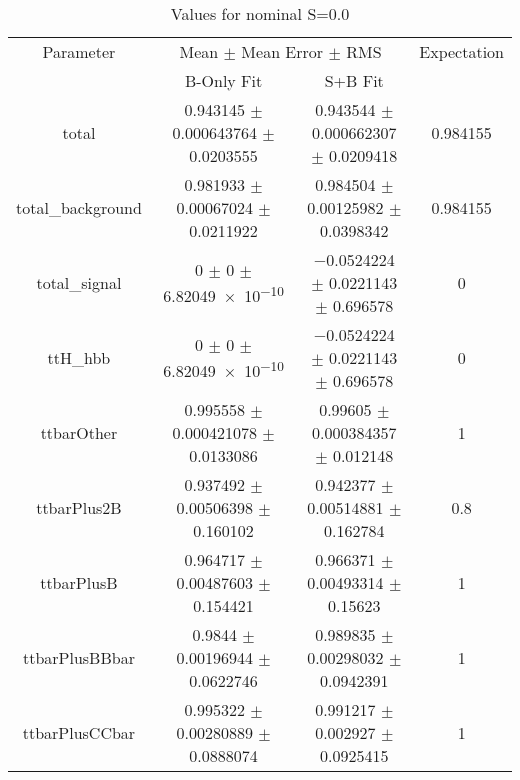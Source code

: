 \begin{table}
\centering
\caption{Values for nominal S=0.0}
\begin{tabular}{cccc}
\toprule
Parameter & \multicolumn{2}{c}{Mean $\pm$ Mean Error $\pm$ RMS} & Expectation\\
 & B-Only Fit & S+B Fit & \\
\midrule
total & \num{0.943145} $\pm$ \num{0.000643764} $\pm$ \num{0.0203555} & \num{0.943544} $\pm$ \num{0.000662307} $\pm$ \num{0.0209418} & \num{0.984155}\\
total\_background & \num{0.981933} $\pm$ \num{0.00067024} $\pm$ \num{0.0211922} & \num{0.984504} $\pm$ \num{0.00125982} $\pm$ \num{0.0398342} & \num{0.984155}\\
total\_signal & \num{0} $\pm$ \num{0} $\pm$ \num{6.82049e-10} & \num{-0.0524224} $\pm$ \num{0.0221143} $\pm$ \num{0.696578} & \num{0}\\
ttH\_hbb & \num{0} $\pm$ \num{0} $\pm$ \num{6.82049e-10} & \num{-0.0524224} $\pm$ \num{0.0221143} $\pm$ \num{0.696578} & \num{0}\\
ttbarOther & \num{0.995558} $\pm$ \num{0.000421078} $\pm$ \num{0.0133086} & \num{0.99605} $\pm$ \num{0.000384357} $\pm$ \num{0.012148} & \num{1}\\
ttbarPlus2B & \num{0.937492} $\pm$ \num{0.00506398} $\pm$ \num{0.160102} & \num{0.942377} $\pm$ \num{0.00514881} $\pm$ \num{0.162784} & \num{0.8}\\
ttbarPlusB & \num{0.964717} $\pm$ \num{0.00487603} $\pm$ \num{0.154421} & \num{0.966371} $\pm$ \num{0.00493314} $\pm$ \num{0.15623} & \num{1}\\
ttbarPlusBBbar & \num{0.9844} $\pm$ \num{0.00196944} $\pm$ \num{0.0622746} & \num{0.989835} $\pm$ \num{0.00298032} $\pm$ \num{0.0942391} & \num{1}\\
ttbarPlusCCbar & \num{0.995322} $\pm$ \num{0.00280889} $\pm$ \num{0.0888074} & \num{0.991217} $\pm$ \num{0.002927} $\pm$ \num{0.0925415} & \num{1}\\
\bottomrule
\end{tabular}
\end{table}